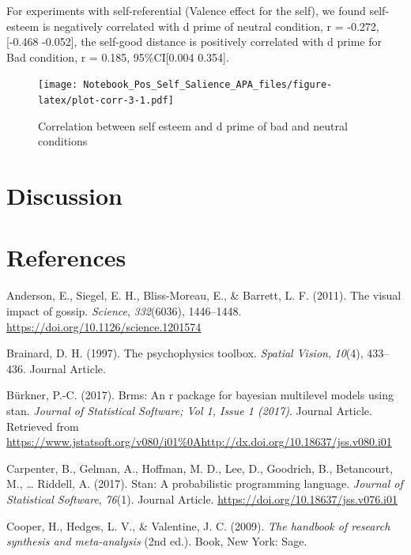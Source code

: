 \documentclass[
  english,
  man]{apa6}
\begin{document}
For experiments with self-referential (Valence effect for the self), we found self-esteem is negatively correlated with d prime of neutral condition, r = -0.272, {[}-0.468 -0.052{]}, the self-good distance is positively correlated with d prime for Bad condition, r = 0.185, 95\%CI{[}0.004 0.354{]}.

\begin{figure}
\centering
\texttt{[image: Notebook\_Pos\_Self\_Salience\_APA\_files/figure-latex/plot-corr-3-1.pdf]}
\caption{\label{fig:plot-corr-3}Correlation between self esteem and d prime of bad and neutral conditions}
\end{figure}

\hypertarget{discussion-2}{%
\section{Discussion}\label{discussion-2}}

\hypertarget{references}{%
\section{References}\label{references}}

\begingroup
\setlength{\parindent}{-0.5in}
\setlength{\leftskip}{0.5in}

\hypertarget{refs}{}
\leavevmode\hypertarget{ref-anderson_visual_2011}{}%
Anderson, E., Siegel, E. H., Bliss-Moreau, E., \& Barrett, L. F. (2011). The visual impact of gossip. \emph{Science}, \emph{332}(6036), 1446--1448. \url{https://doi.org/10.1126/science.1201574}

\leavevmode\hypertarget{ref-Brainard_1997}{}%
Brainard, D. H. (1997). The psychophysics toolbox. \emph{Spatial Vision}, \emph{10}(4), 433--436. Journal Article.

\leavevmode\hypertarget{ref-Buxfcrkner_2017}{}%
Bürkner, P.-C. (2017). Brms: An r package for bayesian multilevel models using stan. \emph{Journal of Statistical Software; Vol 1, Issue 1 (2017)}. Journal Article. Retrieved from \url{https://www.jstatsoft.org/v080/i01\%0Ahttp://dx.doi.org/10.18637/jss.v080.i01}

\leavevmode\hypertarget{ref-Carpenter_2017_stan}{}%
Carpenter, B., Gelman, A., Hoffman, M. D., Lee, D., Goodrich, B., Betancourt, M., \ldots{} Riddell, A. (2017). Stan: A probabilistic programming language. \emph{Journal of Statistical Software}, \emph{76}(1). Journal Article. \url{https://doi.org/10.18637/jss.v076.i01}

\leavevmode\hypertarget{ref-Cooper_2009_handbook}{}%
Cooper, H., Hedges, L. V., \& Valentine, J. C. (2009). \emph{The handbook of research synthesis and meta-analysis} (2nd ed.). Book, New York: Sage.
\end{document}
